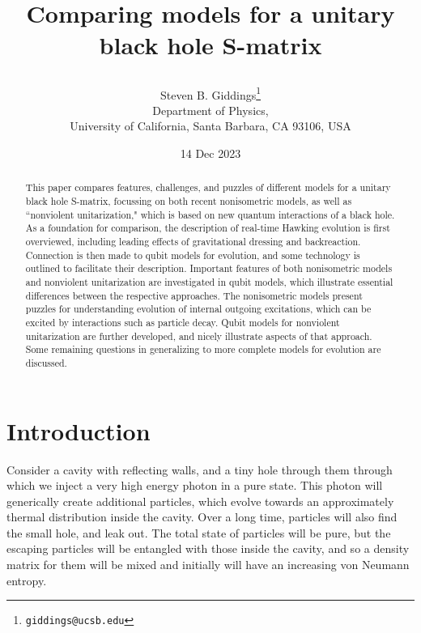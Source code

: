 \documentclass[12pt]{article}
\numberwithin{equation}{section}
\begin{document}
\date{14 Dec 2023}
\title{Comparing models for a unitary black hole S-matrix
\author{Steven B. Giddings\footnote{\texttt{giddings@ucsb.edu}} \\
Department of Physics,\\
University of California, Santa Barbara, CA 93106, USA}}


\maketitle

\begin{abstract}
This paper compares features, challenges, and puzzles of different models for a unitary black hole S-matrix, focussing on both recent nonisometric models, as well as ``nonviolent unitarization," which is based on new quantum interactions of a black hole.  As a foundation for comparison, the description of real-time Hawking evolution is first overviewed, including leading effects of gravitational dressing and backreaction.
Connection is then made to qubit models for evolution, and some technology is outlined to facilitate their description. 
Important features of both nonisometric models and nonviolent unitarization are investigated in qubit models, which illustrate essential differences between the respective approaches.  The nonisometric models present puzzles for understanding evolution of internal outgoing excitations, which can be excited by interactions such as particle decay.  Qubit models for nonviolent unitarization are further developed, and nicely illustrate aspects of that approach.
Some remaining questions in generalizing to more complete models for evolution are discussed.  
\end{abstract}

\newpage

\section{Introduction}

Consider a cavity with reflecting walls, and a tiny hole through them through which we inject a very high energy photon in a pure state.  This photon will generically create additional particles, which evolve towards an approximately thermal distribution inside the cavity.  Over a long time, particles will also  find the small hole, and leak out.  The total state of particles will be pure, but the escaping particles will be entangled with those inside the cavity, and so a density matrix for them will be mixed and initially will have an increasing von Neumann entropy.
\end{document}
